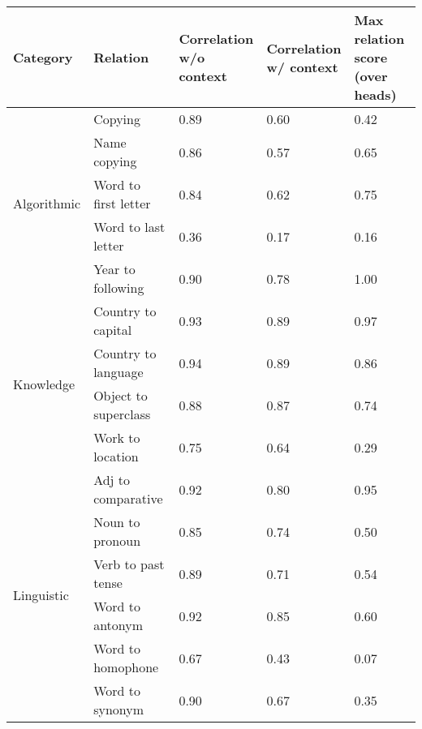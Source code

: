 \begin{tabular}{lllll}
\toprule
Category & Relation & \makecell{Correlation\\w/o context} & \makecell{Correlation\\w/ context} & \makecell{Max relation score\\(over heads)} \\
\midrule
\multirow{5}{*}{Algorithmic} & Copying & 0.89 & 0.60 & 0.42 \\
 & Name copying & 0.86 & 0.57 & 0.65 \\
 & Word to first letter & 0.84 & 0.62 & 0.75 \\
 & Word to last letter & 0.36 & 0.17 & 0.16 \\
 & Year to following & 0.90 & 0.78 & 1.00 \\
\multirow{4}{*}{Knowledge} & Country to capital & 0.93 & 0.89 & 0.97 \\
 & Country to language & 0.94 & 0.89 & 0.86 \\
 & Object to superclass & 0.88 & 0.87 & 0.74 \\
 & Work to location & 0.75 & 0.64 & 0.29 \\
\multirow{6}{*}{Linguistic} & Adj to comparative & 0.92 & 0.80 & 0.95 \\
 & Noun to pronoun & 0.85 & 0.74 & 0.50 \\
 & Verb to past tense & 0.89 & 0.71 & 0.54 \\
 & Word to antonym & 0.92 & 0.85 & 0.60 \\
 & Word to homophone & 0.67 & 0.43 & 0.07 \\
 & Word to synonym & 0.90 & 0.67 & 0.35 \\
\bottomrule
\end{tabular}
